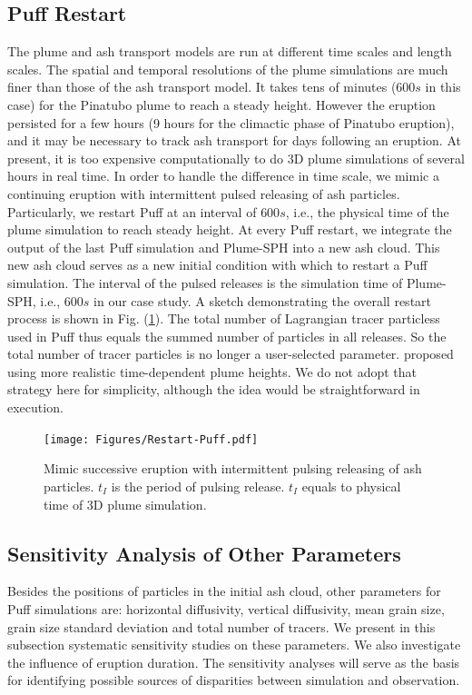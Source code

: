 \documentclass[draft,linenumbers]{agujournal2019}
\begin{document}
\subsection{Puff Restart}

The plume and ash transport models are run at different time scales and length scales.  The spatial and temporal resolutions of the plume simulations are much finer than those of the ash transport model. It takes tens of minutes ($600 s$ in this case) for the Pinatubo plume to reach a steady height. However the eruption persisted for a few hours (9 hours for the climactic phase of Pinatubo eruption), and it may be necessary to track ash transport for days following an eruption.  At present, it is too expensive computationally to do 3D plume simulations of several hours in real time. In order to handle the difference in time scale, we mimic a continuing eruption with intermittent pulsed releasing of ash particles. Particularly, we restart Puff at an interval of $600 s$, i.e., the physical time of the plume simulation to reach steady height. At every Puff restart, we integrate the output of the last Puff simulation and Plume-SPH into a new ash cloud. This new ash cloud serves as a new initial condition with which to restart a Puff simulation. The interval of the pulsed releases is the simulation time of Plume-SPH, i.e., $600 s$ in our case study. A sketch demonstrating the overall restart process is shown in Fig. (\ref{fig:Restart-Puff}). The total number of Lagrangian tracer particless used in Puff thus equals the summed number of particles in all releases. So the total number of tracer particles is no longer a user-selected parameter.  \citet{fero2008simulation} proposed using more realistic time-dependent plume heights. We do not adopt that strategy here for simplicity, although the idea would be straightforward in execution.

\begin{figure}
\center
\texttt{[image: Figures/Restart-Puff.pdf]} 
    \caption{Mimic successive eruption with intermittent pulsing releasing of ash particles. $t_I$ is the period of pulsing release. $t_I$ equals to physical time of 3D plume simulation.}
    \label{fig:Restart-Puff}
\end{figure}

\subsection{Sensitivity Analysis of Other Parameters}

Besides the positions of particles in the initial ash cloud, other parameters for Puff simulations are: horizontal diffusivity, vertical diffusivity, mean grain size, grain size standard deviation and total number of tracers. We present in this subsection systematic sensitivity studies on these parameters. We also investigate the influence of eruption duration.  The sensitivity analyses will serve as the basis for identifying possible sources of disparities between simulation and observation.
\end{document}
